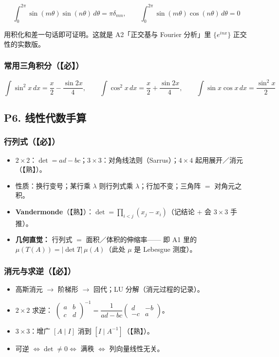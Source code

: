\[
\int_0^{2\pi}\sin(m\theta)\sin(n\theta)\,d\theta=\pi\delta_{mn},\qquad
\int_0^{2\pi}\sin(m\theta)\cos(n\theta)\,d\theta=0
\]

用积化和差一句话即可证明。这就是 A2「正交基与 Fourier 分析」里 $\{e^{inx}\}$ 正交性的实数版。

\subsubsection{常用三角积分（【必】）}

\[
\int\sin^2x\,dx=\frac x2-\frac{\sin2x}{4},\qquad
\int\cos^2x\,dx=\frac x2+\frac{\sin2x}{4},\qquad
\int\sin x\cos x\,dx=\frac{\sin^2x}{2}
\]

\subsection{P6. 线性代数手算}

\subsubsection{行列式（【必】）}

\begin{itemize}
  \item $2\times2$：$\det=ad-bc$；$3\times3$：对角线法则（Sarrus）；$4\times4$ 起用展开／消元（【熟】）。
  \item 性质：换行变号；某行乘 $\lambda$ 则行列式乘 $\lambda$；行加不变；三角阵 $=$ 对角元之积。
  \item \textbf{Vandermonde}（【熟】）：$\det=\prod_{i<j}(x_j-x_i)$（记结论 $+$ 会 $3\times3$ 手推）。
  \item \textbf{几何直觉：} 行列式 $=$ 面积／体积的伸缩率——
        即 A1 里的 $\mu(T(A))=|\det T|\,\mu(A)$（此处 $\mu$ 是 Lebesgue 测度）。
\end{itemize}

\subsubsection{消元与求逆（【必】）}

\begin{itemize}
  \item 高斯消元 $\to$ 阶梯形 $\to$ 回代；LU 分解（消元过程的记录）。
  \item $2\times2$ 求逆：
        $\begin{pmatrix}a&b\\c&d\end{pmatrix}^{-1}=\dfrac{1}{ad-bc}\begin{pmatrix}d&-b\\-c&a\end{pmatrix}$。
  \item $3\times3$：增广 $[A\mid I]$ 消到 $[I\mid A^{-1}]$（【熟】）。
  \item 可逆 $\iff\det\ne0\iff$ 满秩 $\iff$ 列向量线性无关。
\end{itemize}

